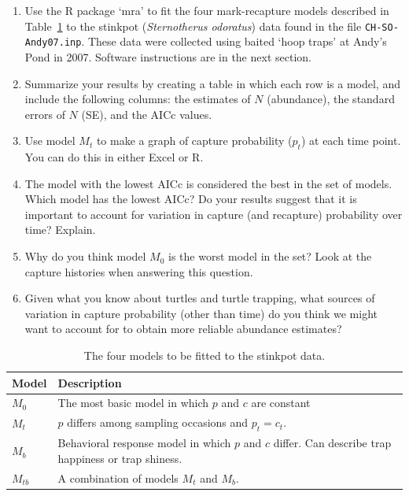 \documentclass[12pt]{article}\usepackage[]{graphicx}\usepackage[]{color}
\begin{document}
\begin{enumerate}
  \item Use the R package `mra' to fit the four
    mark-recapture models described in Table~\ref{tab:Otis} to the
    stinkpot ({\it Sternotherus odoratus}) data found in the file
    \verb+CH-SO-Andy07.inp+. These data were collected using baited
    `hoop traps' at Andy's Pond in 2007. Software instructions are in
    the next section. 
  \item Summarize your results by creating a table in which each row
    is a model, and include the following columns: the estimates of $N$
    (abundance), the standard errors of $N$ (SE), and the AICc
    values.
  \item Use model $M_t$ to make a graph of capture probability ($p_t$)
    at each time point. You can do this in either Excel or R.
  \item The model with the lowest AICc is considered the best in
    the set of models. Which model has the lowest AICc? Do your
    results suggest that it is important to account for variation in
    capture (and recapture) probability over time? Explain.
  \item Why do you think model $M_0$ is the worst model
    in the set? Look at the capture histories when answering this
    question. 
  \item Given what you know about turtles and turtle trapping,
    what sources of variation in capture probability (other than time)
    do you think we might want to account for to obtain more reliable
    abundance estimates?
\end{enumerate}

\clearpage

\begin{table}[h!]
  \centering
  \caption{The four models to be fitted to the stinkpot data.}
  \begin{tabular}[h!]{lp{5in}}
    \hline
    Model & Description \\
    \hline
    $M_0$ & The most basic model in which $p$ and $c$ are constant \\
    $M_t$ & $p$ differs among sampling occasions and $p_t=c_t$. \\
    $M_b$ & Behavioral response model in which $p$ and $c$
            differ. Can describe trap happiness or trap shiness. \\
    $M_{tb}$ & A combination of models $M_t$ and $M_b$. \\
    \hline
  \end{tabular}
  \label{tab:Otis}
\end{table}
\end{document}
